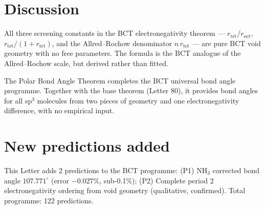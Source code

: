 \documentclass[aps,prl,twocolumn,superscriptaddress,floatfix]{revtex4-2}
\begin{document}
\section{Discussion}

All three screening constants in the BCT electronegativity
theorem --- $r_\mathrm{tet}/r_\mathrm{oct}$,
$r_\mathrm{tet}/(1+r_\mathrm{tet})$, and the Allred--Rochow
denominator $n\,r_\mathrm{tet}$ --- are pure BCT void geometry
with no free parameters. The formula is the BCT analogue of
the Allred--Rochow scale, but derived rather than fitted.

The Polar Bond Angle Theorem completes the BCT universal
bond angle programme. Together with the base theorem
(Letter 80), it provides bond angles for all sp$^3$
molecules from two pieces of geometry and one
electronegativity difference, with no empirical input.

\section*{New predictions added}

This Letter adds 2 predictions to the BCT programme:
(P1) NH$_3$ corrected bond angle $107.771^\circ$
(error $-0.027\%$, sub-0.1\%);
(P2) Complete period 2 electronegativity ordering
from void geometry (qualitative, confirmed).
Total programme: 122 predictions.
\end{document}
